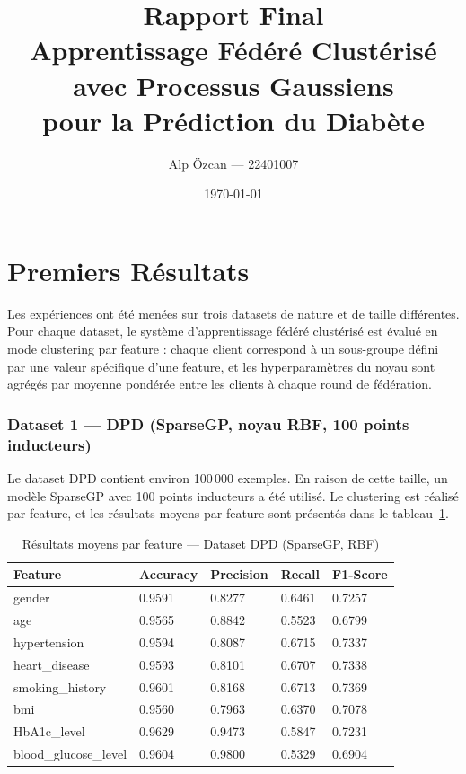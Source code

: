 \documentclass[12pt,a4paper]{article}
\title{Rapport Final\\
\large Apprentissage Fédéré Clustérisé avec Processus Gaussiens\\
pour la Prédiction du Diabète}
\author{Alp Özcan — 22401007}
\date{\today}
\begin{document}
\maketitle
\tableofcontents
\newpage


\section{Premiers Résultats}

Les expériences ont été menées sur trois datasets de nature et de taille différentes. Pour chaque dataset, le système d'apprentissage fédéré clustérisé est évalué en mode clustering par feature : chaque client correspond à un sous-groupe défini par une valeur spécifique d'une feature, et les hyperparamètres du noyau sont agrégés par moyenne pondérée entre les clients à chaque round de fédération.

\subsubsection*{Dataset 1 — DPD (SparseGP, noyau RBF, 100 points inducteurs)}

Le dataset DPD contient environ 100\,000 exemples. En raison de cette taille, un modèle SparseGP avec 100 points inducteurs a été utilisé. Le clustering est réalisé par feature, et les résultats moyens par feature sont présentés dans le tableau~\ref{tab:dpd_results}.

\begin{table}[H]
\centering
\caption{Résultats moyens par feature — Dataset DPD (SparseGP, RBF)}
\label{tab:dpd_results}
\small
\begin{tabular}{p{3.5cm}p{2.5cm}p{2.5cm}p{2.5cm}p{2.5cm}}
\hline
\textbf{Feature} & \textbf{Accuracy} & \textbf{Precision} & \textbf{Recall} & \textbf{F1-Score} \\
\hline
gender               & 0.9591 & 0.8277 & 0.6461 & 0.7257 \\
age                  & 0.9565 & 0.8842 & 0.5523 & 0.6799 \\
hypertension         & 0.9594 & 0.8087 & 0.6715 & 0.7337 \\
heart\_disease        & 0.9593 & 0.8101 & 0.6707 & 0.7338 \\
smoking\_history     & 0.9601 & 0.8168 & 0.6713 & 0.7369 \\
bmi                  & 0.9560 & 0.7963 & 0.6370 & 0.7078 \\
HbA1c\_level         & 0.9629 & 0.9473 & 0.5847 & 0.7231 \\
blood\_glucose\_level & 0.9604 & 0.9800 & 0.5329 & 0.6904 \\
\hline
\end{tabular}
\end{table}
\end{document}
